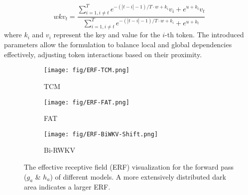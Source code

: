 \begin{equation}
wkv_t = \frac{\sum_{i=1, i \neq t}^T e^{-(|t-i|-1) / T \cdot w + k_i} v_i + e^{u + k_t} v_t}{\sum_{i=1, i \neq t}^T e^{-(|t-i|-1) / T \cdot w + k_i} + e^{u + k_t}}
\end{equation}
where \( k_i \) and \( v_i \) represent the key and value for the \( i \)-th token. The introduced parameters allow the formulation to balance local and global dependencies effectively, adjusting token interactions based on their proximity.










\begin{figure}[t]
    \begin{subfigure}[b]{0.15\textwidth}
        \texttt{[image: fig/ERF-TCM.png]}
        \caption{TCM}
        \label{fig:model-erf-sub1}
    \end{subfigure}
    \begin{subfigure}[b]{0.15\textwidth}
        \texttt{[image: fig/ERF-FAT.png]}
        \caption{FAT}
        \label{fig:model-erf-sub2}
    \end{subfigure}
    \begin{subfigure}[b]{0.15\textwidth}
        \texttt{[image: fig/ERF-BiWKV-Shift.png]}
        \caption{Bi-RWKV}
        \label{fig:model-erf-sub3}
    \end{subfigure}
  \caption{The effective receptive field (ERF) \cite{Luo.2016.ERF} visualization for the forward pass ($g_a$ \& $h_a$) of different models. A more extensively distributed dark area indicates a larger ERF.} 
  \label{fig:model-erf}
\end{figure}



